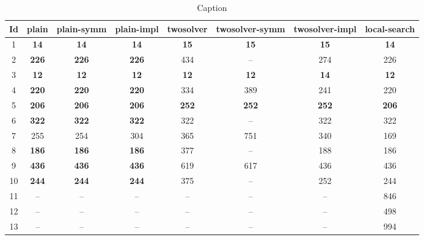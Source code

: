 \begin{table}[h]
	\centering
	\caption{Caption}
	\begin{tabular}{cccccccc}
		\toprule
		Id & plain & plain-symm & plain-impl & twosolver & twosolver-symm & twosolver-impl & local-search \\ 
		\midrule
		1 & \textbf{14} & 	\textbf{14} & 	\textbf{14} & 	\textbf{15} & 	\textbf{15} & 	\textbf{15} & 	\textbf{14} \\ 
		2 & \textbf{226} & 	\textbf{226} & 	\textbf{226} & 	434 & 	-- & 	274 & 	226 \\ 
		3 & \textbf{12} & 	\textbf{12} & 	\textbf{12} & 	\textbf{12} & 	\textbf{12} & 	\textbf{14} & 	\textbf{12} \\ 
		4 & \textbf{220} & 	\textbf{220} & 	\textbf{220} & 	334 & 	389 & 	241 & 	220 \\ 
		5 & \textbf{206} & 	\textbf{206} & 	\textbf{206} & 	\textbf{252} & 	\textbf{252} & 	\textbf{252} & 	\textbf{206} \\ 
		6 & \textbf{322} & 	\textbf{322} & 	\textbf{322} & 	322 & 	-- & 	322 & 	322 \\ 
		7 & 255 & 	254 & 	304 & 	365 & 	751 & 	340 & 	169 \\ 
		8 & \textbf{186} & 	\textbf{186} & 	\textbf{186} & 	377 & 	-- & 	188 & 	186 \\ 
		9 & \textbf{436} & 	\textbf{436} & 	\textbf{436} & 	619 & 	617 & 	436 & 	436 \\ 
		10 & \textbf{244} & 	\textbf{244} & 	\textbf{244} & 	375 & 	-- & 	252 & 	244 \\ 
		11 & -- & 	-- & 	-- & 	-- & 	-- & 	-- & 	846 \\ 
		12 & -- & 	-- & 	-- & 	-- & 	-- & 	-- & 	498 \\ 
		13 & -- & 	-- & 	-- & 	-- & 	-- & 	-- & 	994 \\ 
		\bottomrule
	\end{tabular}
\end{table}


    